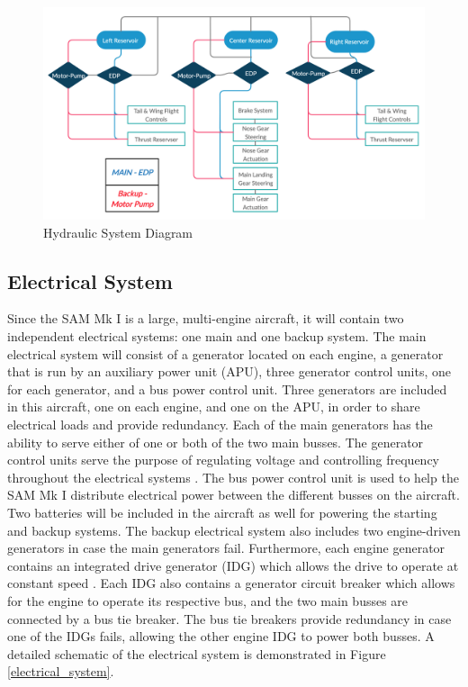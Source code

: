 \begin{figure}[H]
    \centering
    \includegraphics[width=.85\linewidth]{Photos/systems/Hydrualics.png}
    \caption{Hydraulic System Diagram}
    \label{hydrualics}
\end{figure}

\subsection{Electrical System}
Since the SAM Mk I is a large, multi-engine aircraft, it will contain two independent electrical systems: one main and one backup system. The main electrical system will consist of a generator located on each engine, a generator that is run by an auxiliary power unit (APU), three generator control units, one for each generator, and a bus power control unit. Three generators are included in this aircraft, one on each engine, and one on the APU, in order to share electrical loads and provide redundancy. Each of the main generators has the ability to serve either of one or both of the two main busses. The generator control units serve the purpose of regulating voltage and controlling frequency throughout the electrical systems \cite{electrical_system}. The bus power control unit is used to help the SAM Mk I distribute electrical power between the different busses on the aircraft. Two batteries will be included in the aircraft as well for powering the starting and backup systems. The backup electrical system also includes two engine-driven generators in case the main generators fail. Furthermore, each engine generator contains an integrated drive generator (IDG) which allows the drive to operate at constant speed \cite{electrical_system}. Each IDG also contains a generator circuit breaker which allows for the engine to operate its respective bus, and the two main busses are connected by a bus tie breaker. The bus tie breakers provide redundancy in case one of the IDGs fails, allowing the other engine IDG to power both busses. A detailed schematic of the electrical system is demonstrated in Figure \ref{electrical_system}. 

